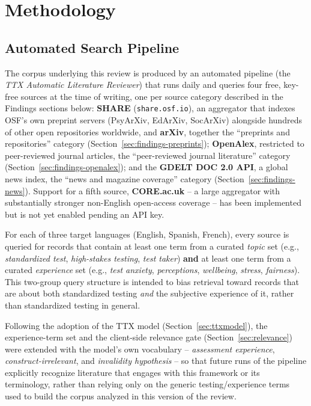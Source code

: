 \documentclass[11pt]{article}
\begin{document}
\section{Methodology}
\label{sec:methodology}

\subsection{Automated Search Pipeline}

The corpus underlying this review is produced by an automated pipeline (the \emph{TTX Automatic Literature Reviewer}) that runs daily and queries four free, key-free sources at the time of writing, one per source category described in the Findings sections below: \textbf{SHARE} (\texttt{share.osf.io}), an aggregator that indexes OSF's own preprint servers (PsyArXiv, EdArXiv, SocArXiv) alongside hundreds of other open repositories worldwide, and \textbf{arXiv}, together the ``preprints and repositories'' category (Section~\ref{sec:findings-preprints}); \textbf{OpenAlex}, restricted to peer-reviewed journal articles, the ``peer-reviewed journal literature'' category (Section~\ref{sec:findings-openalex}); and the \textbf{GDELT DOC 2.0 API}, a global news index, the ``news and magazine coverage'' category (Section~\ref{sec:findings-news}). Support for a fifth source, \textbf{CORE.ac.uk} -- a large aggregator with substantially stronger non-English open-access coverage -- has been implemented but is not yet enabled pending an API key.

For each of three target languages (English, Spanish, French), every source is queried for records that contain at least one term from a curated \emph{topic} set (e.g., \textit{standardized test}, \textit{high-stakes testing}, \textit{test taker}) \textbf{and} at least one term from a curated \emph{experience} set (e.g., \textit{test anxiety}, \textit{perceptions}, \textit{wellbeing}, \textit{stress}, \textit{fairness}). This two-group query structure is intended to bias retrieval toward records that are about both standardized testing \emph{and} the subjective experience of it, rather than standardized testing in general.

Following the adoption of the TTX model (Section~\ref{sec:ttxmodel}), the experience-term set and the client-side relevance gate (Section~\ref{sec:relevance}) were extended with the model's own vocabulary -- \textit{assessment experience}, \textit{construct-irrelevant}, and \textit{invalidity hypothesis} -- so that future runs of the pipeline explicitly recognize literature that engages with this framework or its terminology, rather than relying only on the generic testing/experience terms used to build the corpus analyzed in this version of the review.
\end{document}
